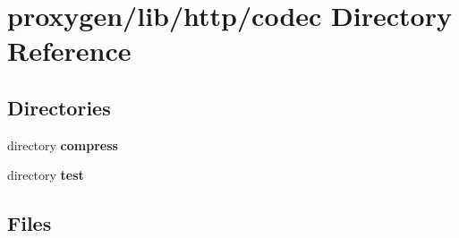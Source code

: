 \section{proxygen/lib/http/codec Directory Reference}
\label{dir_f30caabe577ba4a66bd56f7edcb2a3d8}
\subsection*{Directories}
\begin{DoxyCompactItemize}
\item 
directory {\bf compress}
\item 
directory {\bf test}
\end{DoxyCompactItemize}
\subsection*{Files}
